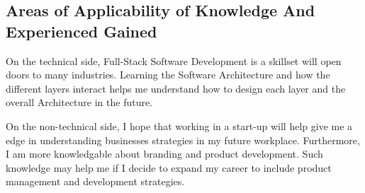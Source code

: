 \subsection{Areas of Applicability of Knowledge And Experienced Gained}
\noindent
On the technical side, Full-Stack Software Development is a skillset will open doors to many industries. Learning the Software Architecture and how the different layers interact helps me understand how to design each layer and the overall
Architecture in the future.

\noindent
On the non-technical side, I hope that working in a start-up will help give me a edge in understanding businesses strategies in my future workplace. Furthermore, I am more knowledgable about branding and product development. Such knowledge may help me if I decide to expand my career
to include product management and development strategies.
